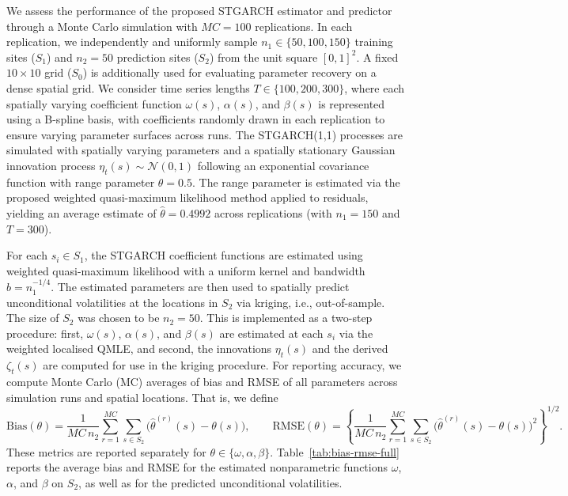 \documentclass[fleqn,11pt]{article}
\begin{document}
We assess the performance of the proposed STGARCH estimator and predictor through a Monte Carlo simulation with \(MC = 100\) replications. In each replication, we independently and uniformly sample \(n_1 \in \{50, 100, 150\}\) training sites (\(S_1\)) and \(n_2 = 50\) prediction sites (\(S_2\)) from the unit square \([0,1]^2\). A fixed \(10 \times 10\) grid (\(S_0\)) is additionally used for evaluating parameter recovery on a dense spatial grid. We consider time series lengths \(T \in \{100, 200, 300\}\), where each spatially varying coefficient function \(\omega(s)\), \(\alpha(s)\), and \(\beta(s)\) is represented using a B-spline basis, with coefficients randomly drawn in each replication to ensure varying parameter surfaces across runs. The STGARCH(1,1) processes are simulated with spatially varying parameters and a spatially stationary Gaussian innovation process \(\eta_t(s) \sim \mathcal{N}(0, 1)\) following an exponential covariance function with range parameter \(\theta = 0.5\). The range parameter is estimated via the proposed weighted quasi-maximum likelihood method applied to residuals, yielding an average estimate of \(\hat{\theta} = 0.4992\) across replications (with $n_1 = 150$ and $T = 300$).

For each \(s_i \in S_1\), the STGARCH coefficient functions are estimated using weighted quasi-maximum likelihood with a uniform kernel and bandwidth \(b = n_1^{-1/4}\). The estimated parameters are then used to spatially predict unconditional volatilities at the locations in \(S_2\) via kriging, i.e., out-of-sample. The size of $S_2$ was chosen to be $n_2 = 50$. This is implemented as a two-step procedure: first, \(\omega(s)\), \(\alpha(s)\), and \(\beta(s)\) are estimated at each \(s_i\) via  the weighted localised QMLE, and second, the innovations \(\eta_t(s)\) and the derived \(\zeta_t(s)\) are computed for use in the kriging procedure. For reporting accuracy, we compute Monte Carlo (MC) averages of bias and RMSE of all parameters across simulation runs and spatial locations. That is, we define
\[
\mathrm{Bias}(\theta)
=\frac{1}{MC\,n_2}\sum_{r=1}^{MC}\sum_{s\in S_2}\bigl(\hat \theta^{(r)}(s)-\theta(s)\bigr),
\qquad
\mathrm{RMSE}(\theta)
=\left\{\frac{1}{MC\,n_2}\sum_{r=1}^{MC}\sum_{s\in S_2}\bigl(\hat \theta^{(r)}(s)-\theta(s)\bigr)^2\right\}^{1/2}.
\]
These metrics are reported separately for \(\theta \in\{\omega,\alpha,\beta\}\). Table~\ref{tab:bias-rmse-full} reports the average bias and RMSE for the estimated nonparametric functions \(\omega\), \(\alpha\), and \(\beta\) on \(S_2\), as well as for the predicted unconditional volatilities.
\end{document}
